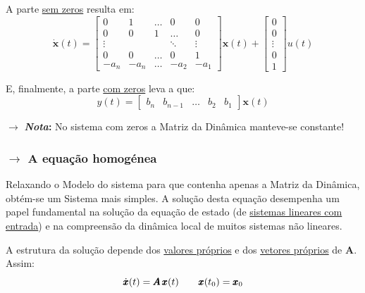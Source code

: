 \noindent A parte \underline{sem zeros} resulta em:
$$
    \dot{\pmb{x}}(t) = 
    \begin{bmatrix} 
        0 & 1 & \dots & 0 & 0\\
        0 & 0 & 1 & \dots & 0\\
        \vdots &  &  & \ddots & \vdots\\
        0 & 0 & \dots & 0 & 1\\
        -a_n & -a_n & \dots & -a_2 & -a_1 
    \end{bmatrix} \pmb{x}(t) 
    + 
    \begin{bmatrix} 
        0\\
        0\\
        \vdots\\
        0\\
        1
    \end{bmatrix}
    u(t)
$$

\noindent E, finalmente, a parte \underline{com zeros} leva a que:
$$
    y(t) = 
    \begin{bmatrix}
        b_n & b_{n-1} & \dots & b_2 & b_1    
    \end{bmatrix}
    \pmb{x}(t)
$$

{

\begin{mdframed}
    \noindent $\pmb{\rightarrow}$ \textbf{\textit{Nota}:} No sistema com zeros a Matriz da Dinâmica manteve-se constante!
\end{mdframed}
}

\subsubsection[1.1.4 A equação homogénea e Notas sobre Álgebra Linear]{$\pmb{\rightarrow}$ A equação homogénea}
\label{subsec:homogeneous-equation}

Relaxando o Modelo do sistema para que contenha apenas a Matriz da Dinâmica, obtém-se um Sistema mais simples. A solução desta equação desempenha um papel fundamental na solução da equação de estado (de \hyperref[subsec:non-homogeneous-equation]{sistemas lineares com entrada}) e na compreensão da
dinâmica local de muitos sistemas não lineares. 

A estrutura da solução depende dos \underline{valores próprios} e dos \underline{vetores próprios} de $\pmb{A}$. Assim:
\vspace{0em}
$$
    \dot{\pmb{x}}(t) = \pmb{A}\, \pmb{x}(t)\qquad \pmb{x}(t_0) = \pmb{x}_0 \\
$$

